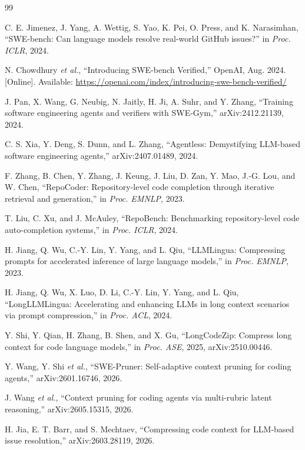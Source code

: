 \begin{thebibliography}{99}

 C. E. Jimenez, J. Yang, A. Wettig, S. Yao, K. Pei, O. Press, and K. Narasimhan, ``SWE-bench: Can language models resolve real-world GitHub issues?'' in \emph{Proc. ICLR}, 2024.

 N. Chowdhury \emph{et al.}, ``Introducing SWE-bench Verified,'' OpenAI, Aug. 2024. [Online]. Available: \url{https://openai.com/index/introducing-swe-bench-verified/}

 J. Pan, X. Wang, G. Neubig, N. Jaitly, H. Ji, A. Suhr, and Y. Zhang, ``Training software engineering agents and verifiers with SWE-Gym,'' arXiv:2412.21139, 2024.

 C. S. Xia, Y. Deng, S. Dunn, and L. Zhang, ``Agentless: Demystifying LLM-based software engineering agents,'' arXiv:2407.01489, 2024.

 F. Zhang, B. Chen, Y. Zhang, J. Keung, J. Liu, D. Zan, Y. Mao, J.-G. Lou, and W. Chen, ``RepoCoder: Repository-level code completion through iterative retrieval and generation,'' in \emph{Proc. EMNLP}, 2023.

 T. Liu, C. Xu, and J. McAuley, ``RepoBench: Benchmarking repository-level code auto-completion systems,'' in \emph{Proc. ICLR}, 2024.

 H. Jiang, Q. Wu, C.-Y. Lin, Y. Yang, and L. Qiu, ``LLMLingua: Compressing prompts for accelerated inference of large language models,'' in \emph{Proc. EMNLP}, 2023.

 H. Jiang, Q. Wu, X. Luo, D. Li, C.-Y. Lin, Y. Yang, and L. Qiu, ``LongLLMLingua: Accelerating and enhancing LLMs in long context scenarios via prompt compression,'' in \emph{Proc. ACL}, 2024.

 Y. Shi, Y. Qian, H. Zhang, B. Shen, and X. Gu, ``LongCodeZip: Compress long context for code language models,'' in \emph{Proc. ASE}, 2025, arXiv:2510.00446.

 Y. Wang, Y. Shi \emph{et al.}, ``SWE-Pruner: Self-adaptive context pruning for coding agents,'' arXiv:2601.16746, 2026.

 J. Wang \emph{et al.}, ``Context pruning for coding agents via multi-rubric latent reasoning,'' arXiv:2605.15315, 2026.

 H. Jia, E. T. Barr, and S. Mechtaev, ``Compressing code context for LLM-based issue resolution,'' arXiv:2603.28119, 2026.


\end{thebibliography}
